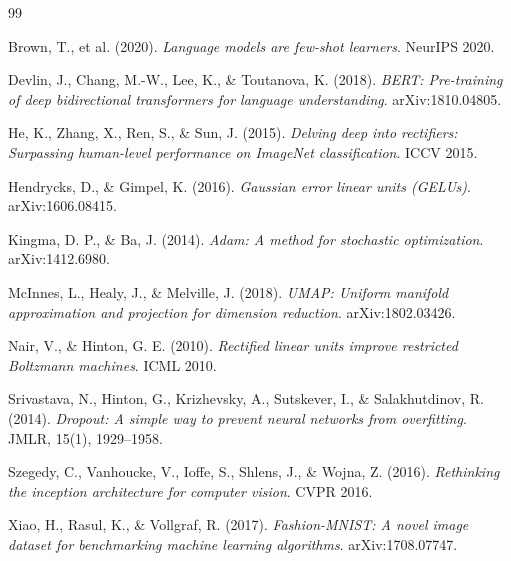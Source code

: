 \documentclass[12pt,letterpaper]{article}
\begin{document}
\newpage

\begin{thebibliography}{99}

Brown, T., et al. (2020).
\textit{Language models are few-shot learners}.
NeurIPS 2020.

Devlin, J., Chang, M.-W., Lee, K., \& Toutanova, K. (2018).
\textit{BERT: Pre-training of deep bidirectional transformers for language understanding}.
arXiv:1810.04805.

He, K., Zhang, X., Ren, S., \& Sun, J. (2015).
\textit{Delving deep into rectifiers: Surpassing human-level performance on ImageNet classification}.
ICCV 2015.

Hendrycks, D., \& Gimpel, K. (2016).
\textit{Gaussian error linear units (GELUs)}.
arXiv:1606.08415.

Kingma, D. P., \& Ba, J. (2014).
\textit{Adam: A method for stochastic optimization}.
arXiv:1412.6980.

McInnes, L., Healy, J., \& Melville, J. (2018).
\textit{UMAP: Uniform manifold approximation and projection for dimension reduction}.
arXiv:1802.03426.

Nair, V., \& Hinton, G. E. (2010).
\textit{Rectified linear units improve restricted Boltzmann machines}.
ICML 2010.

Srivastava, N., Hinton, G., Krizhevsky, A., Sutskever, I., \& Salakhutdinov, R. (2014).
\textit{Dropout: A simple way to prevent neural networks from overfitting}.
JMLR, 15(1), 1929--1958.

Szegedy, C., Vanhoucke, V., Ioffe, S., Shlens, J., \& Wojna, Z. (2016).
\textit{Rethinking the inception architecture for computer vision}.
CVPR 2016.

Xiao, H., Rasul, K., \& Vollgraf, R. (2017).
\textit{Fashion-MNIST: A novel image dataset for benchmarking machine learning algorithms}.
arXiv:1708.07747.

\end{thebibliography}
\end{document}
